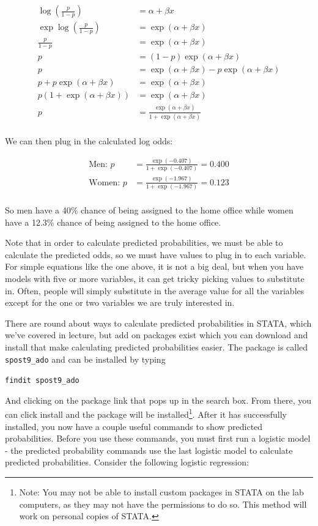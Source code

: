 \documentclass[12pt]{amsart}
\begin{document}
\begin{align*}
\log \left( \frac{p}{1-p} \right) &= \alpha + \beta x\\
\exp \log (\frac{p}{1-p} ) &= \exp( \alpha + \beta x )\\
\frac{p}{1-p} &= \exp( \alpha + \beta x )\\
p &= (1-p) \exp( \alpha + \beta x)\\
p &= \exp( \alpha + \beta x) - p \exp( \alpha + \beta x)\\
p + p \exp( \alpha + \beta x) &= \exp( \alpha + \beta x)\\
p (1 + \exp( \alpha + \beta x)) &= \exp( \alpha + \beta x)\\
p &= \frac{\exp( \alpha + \beta x)}{1+\exp( \alpha + \beta x)}\\
\end{align*}

We can then plug in the calculated log odds:

\begin{align*}
\text{Men: } p &= \frac{\exp(-0.407)}{1+\exp(-0.407)} = 0.400\\
\text{Women: } p &= \frac{\exp(-1.967)}{1+\exp(-1.967)} = 0.123\\
\end{align*}

So men have a 40\% chance of being assigned to the home office while women have a 12.3\% chance of being assigned to the home office.

Note that in order to calculate predicted probabilities, we must be able to calculate the predicted odds, so we must have values to plug in to each variable. For simple equations like the one above, it is not a big deal, but when you have models with five or more variables, it can get tricky picking values to substitute in. Often, people will simply substitute in the average value for all the variables except for the one or two variables we are truly interested in. 


There are round about ways to calculate predicted probabilities in STATA, which we've covered in lecture, but add on packages exist which you can download and install that make calculating predicted probabilities easier. The package is called \texttt{spost9\_ado} and can be installed by typing

\texttt{findit spost9\_ado}

And clicking on the package link that pops up in the search box. From there, you can click install and the package will be installed\footnote{Note: You may not be able to install custom packages in STATA on the lab computers, as they may not have the permissions to do so. This method will work on personal copies of STATA.}. After it has successfully installed, you now have a couple useful commands to show predicted probabilities. Before you use these commands, you must first run a logistic model - the predicted probability commands use the last logistic model to calculate predicted probabilities. Consider the following logistic regression:
\end{document}
